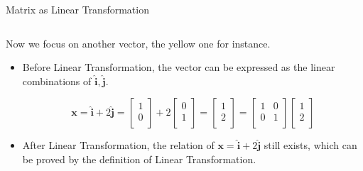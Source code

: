 \documentclass{beamer}
\begin{document}
\begin{frame}{Matrix as Linear Transformation}


\begin{columns}
\vspace{-3pt}

\vspace{-3pt}
\end{columns}



Now we focus on another vector, the yellow one for instance.

\begin{itemize}
    \item Before Linear Transformation, the vector can be expressed as the linear combinations of $\boldsymbol{\hat{i}} , \boldsymbol{\hat{j}}$.

\vspace{-10pt}
\begin{equation*}
\mathbf{x}=\boldsymbol{\hat{i}}+2\boldsymbol{\hat{j}}
=\left[ \begin{array}{c}
	1\\
	0\\
\end{array} \right] +2\left[ \begin{array}{c}
	0\\
	1\\
\end{array} \right] =\left[ \begin{array}{c}
	1\\
	2\\
\end{array} \right] =\left[ \begin{matrix}
	1&		0\\
	0&		1\\
\end{matrix} \right] \left[ \begin{array}{c}
	1\\
	2\\
\end{array} \right]
\end{equation*}

    \item After Linear Transformation, the relation of $\mathbf{x}=\boldsymbol{\hat{i}}+2\boldsymbol{\hat{j}}$ still exists, which can be proved by the definition of Linear Transformation.


\end{itemize}
\end{frame}
\end{document}
